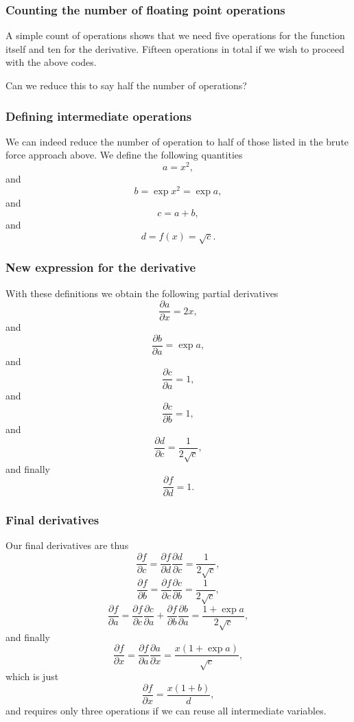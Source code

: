 \documentclass{beamer}
\begin{document}
\begin{frame}
\frametitle{Counting the number of floating point operations}

A simple count of operations shows that we need five operations for
the function itself and ten for the derivative.  Fifteen operations in total if we wish to proceed with the above codes.

Can we reduce this to
say half the number of operations?
\end{frame}

\begin{frame}
\frametitle{Defining intermediate operations}

We can indeed reduce the number of operation to half of those listed in the brute force approach above.
We define the following quantities
\[
a = x^2,
\]
and
\[
b = \exp{x^2} = \exp{a},
\]
and
\[
c= a+b,
\]
and
\[
d=f(x)=\sqrt{c}.
\]
\end{frame}

\begin{frame}
\frametitle{New expression for the derivative}

With these definitions we obtain the following partial derivatives 
\[
\frac{\partial a}{\partial x} = 2x,
\]
and
\[
\frac{\partial b}{\partial a} = \exp{a},
\]
and
\[
\frac{\partial c}{\partial a} = 1,
\]
and
\[
\frac{\partial c}{\partial b} = 1,
\]
and
\[
\frac{\partial d}{\partial c} = \frac{1}{2\sqrt{c}},
\]
and finally
\[
\frac{\partial f}{\partial d} = 1.
\]
\end{frame}

\begin{frame}
\frametitle{Final derivatives}

Our final derivatives are thus
\[
\frac{\partial f}{\partial c} = \frac{\partial f}{\partial d} \frac{\partial d}{\partial c}  = \frac{1}{2\sqrt{c}},
\]
\[
\frac{\partial f}{\partial b} = \frac{\partial f}{\partial c} \frac{\partial c}{\partial b}  = \frac{1}{2\sqrt{c}},
\]
\[
\frac{\partial f}{\partial a} = \frac{\partial f}{\partial c} \frac{\partial c}{\partial a}+
\frac{\partial f}{\partial b} \frac{\partial b}{\partial a}  = \frac{1+\exp{a}}{2\sqrt{c}},
\]
and finally 
\[
\frac{\partial f}{\partial x} = \frac{\partial f}{\partial a} \frac{\partial a}{\partial x}  = \frac{x(1+\exp{a})}{\sqrt{c}},
\]
which is just
\[
\frac{\partial f}{\partial x} = \frac{x(1+b)}{d},
\]
and requires only three operations if we can reuse all intermediate variables.
\end{frame}
\end{document}
